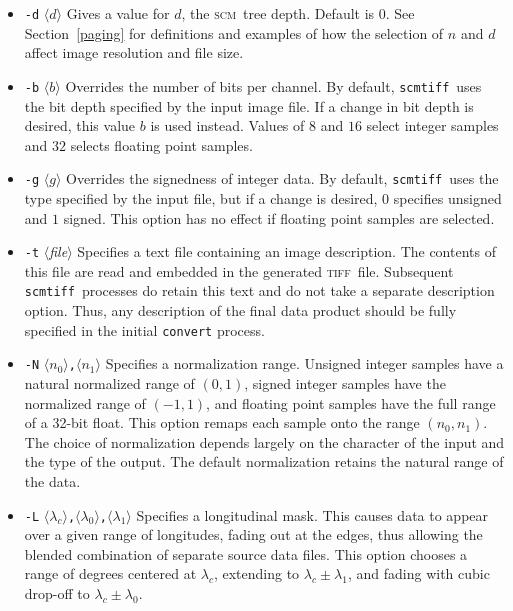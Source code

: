 \documentclass[oneside,10pt]{memoir}
\newcommand{\scm}     {\textsc{scm}}
\newcommand{\tiff}    {\textsc{tiff}}
\newcommand{\scmtiff} {\texttt{scmtiff}}
\newcommand{\inangles}[1]{$\langle$#1$\rangle$}
\newenvironment{optionlist}
  {\setlength{\leftmargini}{1in}\begin{itemize}}{\end{itemize}}
\begin{document}
\begin{Spacing}{1.1}
\begin{optionlist}
\item[\texttt{-d} \inangles{$d$}] Gives a value for $d$, the \scm\ tree depth. Default is $0$. See Section~\ref{paging} for definitions and examples of how the selection of $n$ and $d$ affect image resolution and file size.

\item[\texttt{-b} \inangles{$b$}] Overrides the number of bits per channel. By default, \scmtiff\ uses the bit depth specified by the input image file. If a change in bit depth is desired, this value $b$ is used instead. Values of $8$ and $16$ select integer samples and $32$ selects floating point samples.

\item[\texttt{-g} \inangles{$g$}] Overrides the signedness of integer data. By default, \scmtiff\ uses the type specified by the input file, but if a change is desired, $0$ specifies unsigned and $1$ signed. This option has no effect if floating point samples are selected.

\item[\texttt{-t} \inangles{\textit{file}}] Specifies a text file containing an image description. The contents of this file are read and embedded in the generated \tiff\ file. Subsequent \scmtiff\ processes do retain this text and do not take a separate description option. Thus, any description of the final data product should be fully specified in the initial \texttt{convert} process.

\item[\texttt{-N} \inangles{$n_0$}\texttt{,}\inangles{$n_1$}] Specifies a normalization range. Unsigned integer samples have a natural normalized range of $(0, 1)$, signed integer samples have the normalized range of $(-1,1)$, and floating point samples have the full range of a 32-bit float. This option remaps each sample onto the range $(n_0,n_1)$. The choice of normalization depends largely on the character of the input and the type of the output. The default normalization retains the natural range of the data.

\item[\texttt{-L} \inangles{$\lambda_c$}\texttt{,}\inangles{$\lambda_0$}\texttt{,}\inangles{$\lambda_1$}] Specifies a longitudinal mask. This causes data to appear over a given range of longitudes, fading out at the edges, thus allowing the blended combination of separate source data files. This option chooses a range of degrees centered at $\lambda_c$, extending to $\lambda_c\pm\lambda_1$, and fading with cubic drop-off to $\lambda_c\pm\lambda_0$.


\end{optionlist}
\end{Spacing}
\end{document}
